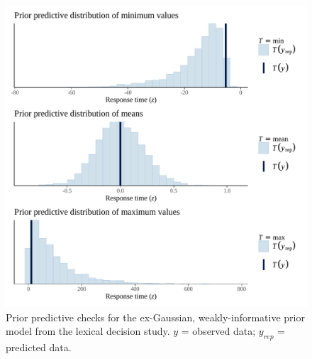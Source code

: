 \documentclass[
  12pt,
  man,floatsintext]{apa7}
\begin{document}
\begin{figure}

{\centering \includegraphics[width=0.8\linewidth]{../lexicaldecision/bayesian_analysis/prior_predictive_checks/plots/lexicaldecision_priorpredictivecheck_weaklyinformativepriors_exgaussian} 

}

\caption{Prior predictive checks for the ex-Gaussian, weakly-informative prior model from the lexical decision study. \(y\) = observed data; \(y_{rep}\) = predicted data.}\label{fig:lexicaldecision-priorpredictivecheck-weaklyinformativepriors-exgaussian}
\end{figure}
\end{document}
